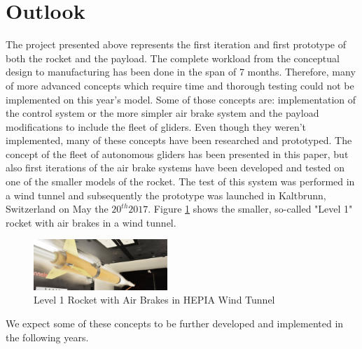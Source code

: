 \documentclass[]{iac}
\begin{document}
\section{Outlook}
The project presented above represents the first iteration and first prototype of both the rocket and the payload. The complete workload from the conceptual design to manufacturing has been done in the span of 7 months. Therefore, many of more advanced concepts which require time and thorough testing could not be implemented on this year's model. Some of those concepts are: implementation of the control system or the more simpler air brake system and the payload modifications to include the fleet of gliders. Even though they weren't implemented, many of these concepts have been researched and prototyped. The concept of the fleet of autonomous gliders has been presented in this paper, but also first iterations of the air brake systems have been developed and tested on one of the smaller models of the rocket. The test of this system was performed in a wind tunnel and subsequently the prototype was launched in Kaltbrunn, Switzerland on May the $20^{th} 2017$. Figure \ref{f:level1_airbrake} shows the smaller, so-called "Level 1" rocket with air brakes in a wind tunnel. 

  \begin{figure}[h!]
 	\centering
        \includegraphics[width=0.45\textwidth]{img/level1.png}
        \caption{Level 1 Rocket with Air Brakes in HEPIA Wind Tunnel}
        \label{f:level1_airbrake}
 \end{figure}

We expect some of these concepts to be further developed and implemented in the following years.



\printglossary[nonumberlist] 



\end{document}
